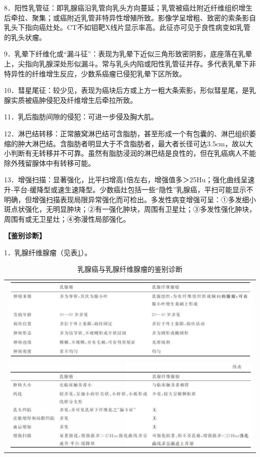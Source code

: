 8．阳性乳管征：即乳腺癌沿乳管向乳头方向蔓延；乳管被癌灶附近纤维组织增生后牵拉、聚集；或癌附近乳管非特异性增殖所致。影像学呈增粗、致密的索条影自乳头下指向癌灶处。CT不如钼靶X线片显示率高。此征亦可见于良性病变如乳管的乳头状瘤。

9．乳晕下纤维化或“漏斗征”：表现为乳晕下近似三角形致密阴影，底座落在乳晕上，尖指向乳腺深处形似漏斗。常与乳头内陷或阳性乳管征并存。多代表乳晕下非特异性的纤维增生反应，少数系癌瘤已侵犯乳晕下区所致。

10．彗星尾征：较少见，表现为癌块后方或上方一粗大条索影，形似彗星尾，是乳腺实质被癌肿侵犯及纤维增生后牵拉所致。

11．乳后脂肪间隙的侵犯：可进一步侵及胸大肌。

12．淋巴结转移：正常腋窝淋巴结可含脂肪，甚至形成一个有包囊的、淋巴组织萎缩的肿大淋巴结。含脂肪者明显大于不含脂肪者，最大者长径可达3.5cm，故以大小判断有无转移并不可靠。虽然有脂肪浸润的淋巴结是良性的，但在乳癌病人不能除外残留腺体中有转移可能。

13．增强扫描：显著强化，比平扫增高1倍左右，增强值多＞25Hu；强化曲线呈速升-平台-缓降型或速生速降型。少数癌灶包括一些“隐性”乳腺癌，平扫可能显示不明确，但增强扫描表现局限异常强化而可检出。多发性病变增强可呈：①多发细小斑点状强化，无明显肿块；②有一强化肿块，周围有卫星灶；③多发性强化肿块，周围有或无卫星灶；④弥漫性局部强化。

\textbf{【鉴别诊断】}

1．乳腺纤维腺瘤（见表\ref{tab9-14}）。

\begin{longtable}{c}
  \caption{乳腺癌与乳腺纤维腺瘤的鉴别诊断}
  \label{tab9-14}\\
  \endfirsthead
  \caption[]{乳腺癌与乳腺纤维腺瘤的鉴别诊断}
  \endhead
\includegraphics[width=\textwidth,height=\textheight,keepaspectratio]{./images/Image00249.jpg}\\
\includegraphics{./images/Image00250.jpg}
\end{longtable}



